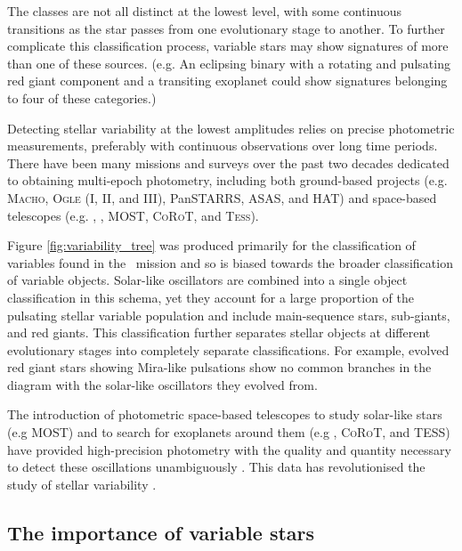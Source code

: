 The classes are not all distinct at the lowest level, with some continuous transitions as the star passes from one evolutionary stage to another. To further complicate this classification process, variable stars may show signatures of more than one of these sources. (e.g. An eclipsing binary with a rotating and pulsating red giant component and a transiting exoplanet could show signatures belonging to four of these categories.) 

Detecting stellar variability at the lowest amplitudes relies on precise photometric measurements, preferably with continuous observations over long time periods.
There have been many missions and surveys over the past two decades dedicated to obtaining multi-epoch photometry, including both ground-based projects (e.g. \textsc{Macho}, \textsc{Ogle} (I, II, and III), PanSTARRS, ASAS, and HAT) and space-based telescopes (e.g. \Kepler, \Gaia, MOST, \textsc{CoRoT}, and \textsc{Tess}).

Figure \ref{fig:variability_tree} was produced primarily for the classification of variables found in the \Gaia~mission and so is biased towards the broader classification of variable objects. Solar-like oscillators are combined into a single object classification in this schema, yet they account for a large proportion of the pulsating stellar variable population and include main-sequence stars, sub-giants, and red giants. This classification further separates stellar objects at different evolutionary stages into completely separate classifications. For example, evolved red giant stars showing Mira-like pulsations show no common branches in the diagram with the solar-like oscillators they evolved from.

The introduction of photometric space-based telescopes to study solar-like stars (e.g MOST) and to search for exoplanets around them (e.g \Kepler, \textsc{CoRoT}, and TESS) have provided high-precision photometry with the quality and quantity necessary to detect these oscillations unambiguously \cite[][and references therein]{chaplin_asteroseismology_2013}. This data has revolutionised the study of stellar variability \cite[e.g.][]{aerts_asteroseismology_2010, di_mauro_review_2017, garcia_asteroseismology_2019}. 

\subsection{The importance of variable stars}

